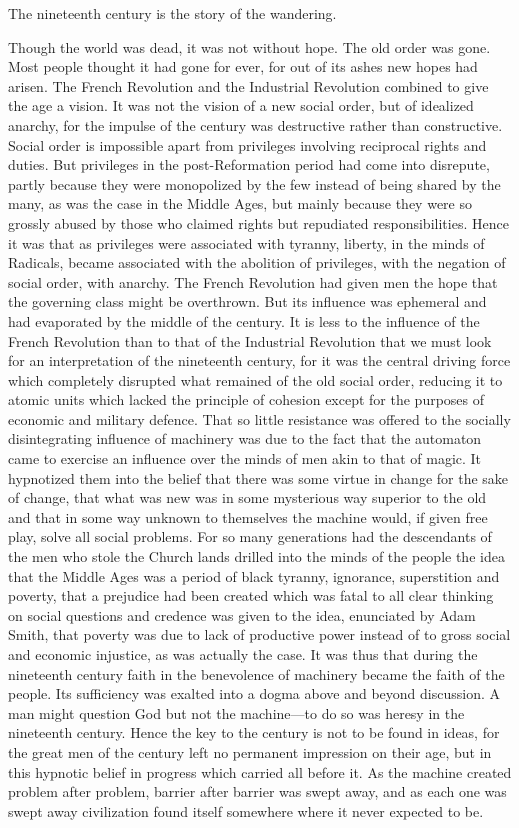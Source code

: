 \documentclass{book}
\begin{document}
The nineteenth century is the story of the wandering.

Though the world was dead, it was not without hope. The old order was gone. Most people thought it had gone for ever, for out of its ashes new hopes had arisen. The French Revolution and the Industrial Revolution combined to give the age a vision. It was not the vision of a new social order, but of idealized anarchy, for the impulse of the century was destructive rather than constructive. Social order is impossible apart from privileges involving reciprocal rights and duties. But privileges in the post-Reformation period had come into disrepute, partly because they were monopolized by the few instead of being shared by the many, as was the case in the Middle Ages, but mainly because they were so grossly abused by those who claimed rights but repudiated responsibilities. Hence it was that as privileges were associated with tyranny, liberty, in the minds of Radicals, became associated with the abolition of privileges, with the negation of social order, with anarchy. The French Revolution had given men the hope that the governing class might be overthrown. But its influence was ephemeral and had evaporated by the middle of the century. It is less to the influence of the French Revolution than to that of the Industrial Revolution that we must look for an interpretation of the nineteenth century, for it was the central driving force which completely disrupted what remained of the old social order, reducing it to atomic units which lacked the principle of cohesion except for the purposes of economic and military defence. That so little resistance was offered to the socially disintegrating influence of machinery was due to the fact that the automaton came to exercise an influence over the minds of men akin to that of magic. It hypnotized them into the belief that there was some virtue in change for the sake of change, that what was new was in some mysterious way superior to the old and that in some way unknown to themselves the machine would, if given free play, solve all social problems. For so many generations had the descendants of the men who stole the Church lands drilled into the minds of the people the idea that the Middle Ages was a period of black tyranny, ignorance, superstition and poverty, that a prejudice had been created which was fatal to all clear thinking on social questions and credence was given to the idea, enunciated by Adam Smith, that poverty was due to lack of productive power instead of to gross social and economic injustice, as was actually the case. It was thus that during the nineteenth century faith in the benevolence of machinery became the faith of the people. Its sufficiency was exalted into a dogma above and beyond discussion. A man might question God but not the machine—to do so was heresy in the nineteenth century. Hence the key to the century is not to be found in ideas, for the great men of the century left no permanent impression on their age, but in this hypnotic belief in progress which carried all before it. As the machine created problem after problem, barrier after barrier was swept away, and as each one was swept away civilization found itself somewhere where it never expected to be.
\end{document}
